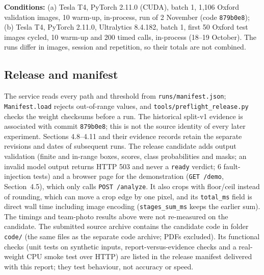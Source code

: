 \documentclass[11pt,a4paper]{article}
\begin{document}
\smallskip
\textbf{Conditions:} (a) Tesla T4, PyTorch 2.11.0 (CUDA), batch 1, 1,106 Oxford validation images, 10 warm-up, in-process, run of 2 November (code \texttt{879b0e8}); (b) Tesla T4, PyTorch 2.11.0, Ultralytics 8.4.182, batch 1, first 50 Oxford test images cycled, 10 warm-up and 200 timed calls, in-process (18--19 October). The runs differ in images, session and repetition, so their totals are not combined.

\subsection{Release and manifest}\label{sec:release}

The service reads every path and threshold from \texttt{runs/manifest.json}; \texttt{Manifest.load} rejects out-of-range values, and \texttt{tools/preflight\_release.py} checks the weight checksums before a run. The historical split-v1 evidence is associated with commit \texttt{879b0e8}; this is not the source identity of every later experiment. Sections 4.8--4.11 and their evidence records retain the separate revisions and dates of subsequent runs. The release candidate adds output validation (finite and in-range boxes, scores, class probabilities and masks; an invalid model output returns HTTP 503 and never a \texttt{ready} verdict; 6 fault-injection tests) and a browser page for the demonstration (\texttt{GET /demo}, Section~4.5), which only calls \texttt{POST /analyze}. It also crops with floor/ceil instead of rounding, which can move a crop edge by one pixel, and its \texttt{total\_ms} field is direct wall time including image encoding (\texttt{stages\_sum\_ms} keeps the earlier sum). The timings and team-photo results above were not re-measured on the candidate. The submitted source archive contains the candidate code in folder \texttt{code/} (the same files as the separate code archive; PDFs excluded). Its functional checks (unit tests on synthetic inputs, report-versus-evidence checks and a real-weight CPU smoke test over HTTP) are listed in the release manifest delivered with this report; they test behaviour, not accuracy or speed.
\end{document}
